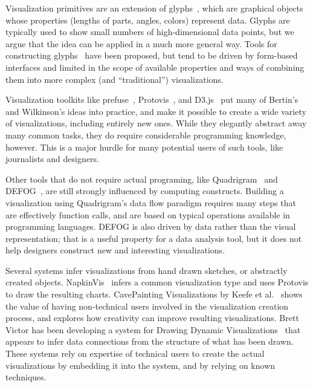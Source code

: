 Visualization primitives are an extension of glyphs~\cite{anderson1957semigraphical}, which are graphical objects whose properties (lengths of parts, angles, colors) represent data.
Glyphs are typically used to show small numbers of high-dimensional data points, but we argue that the idea can be applied in a much more general way.
Tools for constructing glyphs~\cite{ribarsky1994glyphmaker} have been proposed, but tend to be driven by form-based interfaces and limited in the scope of available properties and ways of combining them into more complex (and ``traditional'') visualizations.

\label{tools}

Visualization toolkits like prefuse~\cite{heer2005prefuse}, Protovis~\cite{bostock2009Protovis}, and D3.js~\cite{bostock2011d3} put many of Bertin's and Wilkinson's ideas into practice, and make it possible to create a wide variety of visualizations, including entirely new ones.
While they elegantly abstract away many common tasks, they do require considerable programming knowledge, however.
This is a major hurdle for many potential users of such tools, like journalists and designers.

Other tools that do not require actual programing, like Quadrigram~\cite{url:quadrigram,Ortiz2010} and DEFOG~\cite{Lins:TR:2011}, are still strongly influenced by computing constructs.
Building a visualization using Quadrigram's data flow paradigm requires many steps that are effectively function calls, and are based on typical operations available in programming languages.
DEFOG is also driven by data rather than the visual representation; that is a useful property for a data analysis tool, but it does not help designers construct new and interesting visualizations.

Several systems infer visualizations from hand drawn sketches, or abstractly created objects.
NapkinVis~\cite{Chao2010} infers a common visualization type and uses Protovis to draw the resulting charts.
CavePainting Visualizations by Keefe et al.~\cite{Keefe-2008-SSF} shows the value of having non-technical users involved in the visualization creation process, and explores how creativity can improve resulting visualizations.
Brett Victor has been developing a system for Drawing Dynamic Visualizations~\cite{url:drawingDynamic} that appears to infer data connections from the structure of what has been drawn.
These systems rely on expertise of technical users to create the actual visualizations by embedding it into the system, and by relying on known techniques.

